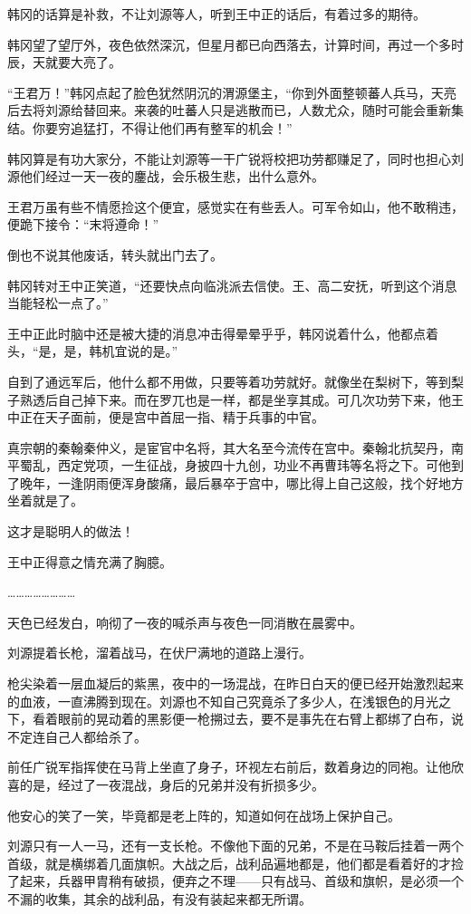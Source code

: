 韩冈的话算是补救，不让刘源等人，听到王中正的话后，有着过多的期待。

韩冈望了望厅外，夜色依然深沉，但星月都已向西落去，计算时间，再过一个多时辰，天就要大亮了。

“王君万！”韩冈点起了脸色犹然阴沉的渭源堡主，“你到外面整顿蕃人兵马，天亮后去将刘源给替回来。来袭的吐蕃人只是逃散而已，人数尤众，随时可能会重新集结。你要穷追猛打，不得让他们再有整军的机会！”

韩冈算是有功大家分，不能让刘源等一干广锐将校把功劳都赚足了，同时也担心刘源他们经过一天一夜的鏖战，会乐极生悲，出什么意外。

王君万虽有些不情愿捡这个便宜，感觉实在有些丢人。可军令如山，他不敢稍违，便跪下接令：“末将遵命！”

倒也不说其他废话，转头就出门去了。

韩冈转对王中正笑道，“还要快点向临洮派去信使。王、高二安抚，听到这个消息当能轻松一点了。”

王中正此时脑中还是被大捷的消息冲击得晕晕乎乎，韩冈说着什么，他都点着头，“是，是，韩机宜说的是。”

自到了通远军后，他什么都不用做，只要等着功劳就好。就像坐在梨树下，等到梨子熟透后自己掉下来。而在罗兀也是一样，都是坐享其成。可几次功劳下来，他王中正在天子面前，便是宫中首屈一指、精于兵事的中官。

真宗朝的秦翰秦仲义，是宦官中名将，其大名至今流传在宫中。秦翰北抗契丹，南平蜀乱，西定党项，一生征战，身披四十九创，功业不再曹玮等名将之下。可他到了晚年，一逢阴雨便浑身酸痛，最后暴卒于宫中，哪比得上自己这般，找个好地方坐着就是了。

这才是聪明人的做法！

王中正得意之情充满了胸臆。

……………………

天色已经发白，响彻了一夜的喊杀声与夜色一同消散在晨雾中。

刘源提着长枪，溜着战马，在伏尸满地的道路上漫行。

枪尖染着一层血凝后的紫黑，夜中的一场混战，在昨日白天的便已经开始激烈起来的血液，一直沸腾到现在。刘源也不知自己究竟杀了多少人，在浅银色的月光之下，看着眼前的晃动着的黑影便一枪搠过去，要不是事先在右臂上都绑了白布，说不定连自己人都给杀了。

前任广锐军指挥使在马背上坐直了身子，环视左右前后，数着身边的同袍。让他欣喜的是，经过了一夜混战，身后的兄弟并没有折损多少。

他安心的笑了一笑，毕竟都是老上阵的，知道如何在战场上保护自己。

刘源只有一人一马，还有一支长枪。不像他下面的兄弟，不是在马鞍后挂着一两个首级，就是横绑着几面旗帜。大战之后，战利品遍地都是，他们都是看着好的才捡了起来，兵器甲胄稍有破损，便弃之不理——只有战马、首级和旗帜，是必须一个不漏的收集，其余的战利品，有没有装起来都无所谓。


